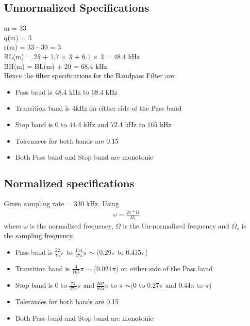 \documentclass[12pt]{article}
\begin{document}
	\subsection{Unnormalized Specifications}
	\color{black}
	m = 33\\
	q(m) = 3\\
	r(m) = 33 - 30 = 3\\
	BL(m) = 25 + 1.7 $\times$ 3 + 6.1 $\times$ 3 = 48.4 kHz\\
	BH(m) = BL(m) + 20 = 68.4 kHz\\
	
	\noindent Hence the filter specifications for the Bandpass Filter are:
	\begin{itemize}
		\item Pass band is 48.4 kHz to 68.4 kHz
		\item Transition band is 4kHz on either side of the Pass band
		\item Stop band is 0 to 44.4 kHz and 72.4 kHz to 165 kHz
		\item Tolerances for both bands are 0.15
		\item Both Pass band and Stop band are monotonic
	\end{itemize}
	
	\color{cyan}
	\subsection{Normalized specifications}
	\color{black}
	Given sampling rate  = 330 kHz. Using\\
	\begin{gather*}
		\omega = \frac{2\pi \ast \Omega}{\Omega_s}
	\end{gather*}
	where $\omega$ is the normalized frequency, $\Omega$ is the Un-normalized frequency and $\Omega_s$ is the sampling frequency.
	\begin{itemize}
		\item Pass band is $\frac{22}{75}\pi$ to $\frac{114}{275}\pi$ $\sim$ (0.29$\pi$ to 0.415$\pi$)
		\item Transition band is $\frac{4}{165}\pi$ $\sim$ (0.024$\pi$) on either side of the Pass band
		\item Stop band is 0 to  $\frac{74}{275}\pi$ and $\frac{362}{825}\pi$ to $\pi$  $\sim$(0 to 0.27$\pi$ and  0.44$\pi$ to $\pi$)
		\item Tolerances for both bands are 0.15
		\item Both Pass band and Stop band are monotonic
	\end{itemize}
	
\end{document}
